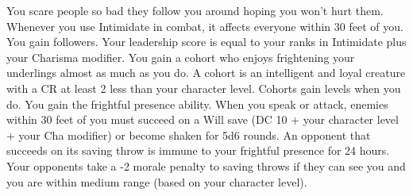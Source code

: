 {You scare people so bad they follow you around hoping you won't hurt them.}
{Whenever you use Intimidate in combat, it affects everyone within 30 feet of you.}{
You gain followers. Your leadership score is equal to your ranks in Intimidate plus your Charisma modifier.}
{You gain a cohort who enjoys frightening your underlings almost as much as you do. A cohort is an intelligent and loyal creature with a CR at least 2 less than your character level. Cohorts gain levels when you do.}
{You gain the frightful presence ability. When you speak or attack, enemies within 30 feet of you must succeed on a Will save (DC 10 + \half your character level + your Cha modifier) or become shaken for 5d6 rounds. An opponent that succeeds on its saving throw is immune to your frightful presence for 24 hours.}
{Your opponents take a -2 morale penalty to saving throws if they can see you and you are within medium range (based on your character level).}